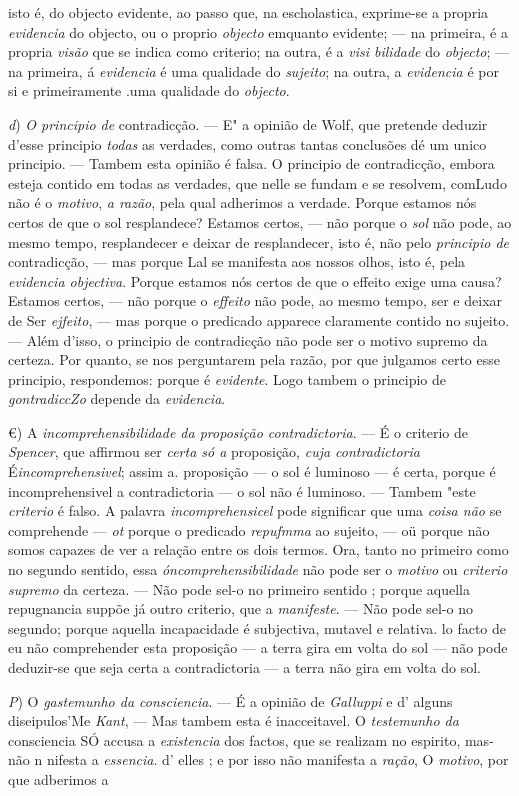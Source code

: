 isto é, do objecto evidente, ao passo que, na escholastica, exprime-se a propria \emph{evidencia} do objecto, ou o proprio \emph{objecto} emquanto evidente; --- na primeira, é a propria \emph{visão} que se indica como criterio; na outra, é a \emph{visi bilidade} do \emph{objecto}; --- na primeira, á \emph{evidencia} é uma qualidade do \emph{sujeito}; na outra, a \emph{evidencia} é por si e primeiramente .uma qualidade do \emph{objecto}.\par \emph{d}) \emph{O principio de} contradicção. --- E" a opinião de Wolf, que pretende deduzir d'esse principio \emph{todas} as verdades, como outras tantas conclusões dé um unico principio. --- Tambem esta opinião é falsa. O principio de contradicção, embora esteja contido em todas as verdades, que nelle se fundam e se resolvem, comLudo não é o \emph{motivo}, \emph{a razão}, pela qual adherimos a verdade. Porque estamos nós certos de que o sol resplandece? Estamos certos, --- não porque o \emph{sol} não pode, ao mesmo tempo, resplandecer e deixar de resplandecer, isto é, não pelo \emph{principio de} contradicção, --- mas porque Lal se manifesta aos nossos olhos, isto é, pela \emph{evidencia objectiva}. Porque estamos nós certos de que o effeito exige uma causa? Estamos certos, --- não porque o \emph{effeito} não pode, ao mesmo tempo, ser e deixar de Ser \emph{ejfeito}, --- mas porque o predicado apparece claramente contido no sujeito. --- Além d'isso, o principio de contradicção não pode ser o motivo supremo da certeza. Por quanto, se nos perguntarem pela razão, por que julgamos certo esse principio, respondemos: porque é \emph{evidente}. Logo tambem o principio de \emph{gontradiccZo} depende da \emph{evidencia}.\par €) A \emph{incomprehensibilidade da proposição contradictoria}. --- É o criterio de \emph{Spencer}, que affirmou ser \emph{certa só a} proposição, \emph{cuja contradictoria} É\emph{incomprehensivel}; assim a. proposição --- o sol é luminoso --- é certa, porque é incomprehensivel a contradictoria --- o sol não é luminoso. --- Tambem "este \emph{criterio} é falso. A palavra \emph{incomprehensicel} pode significar que uma \emph{coisa não} se comprehende --- \emph{ot} porque o predicado \emph{repufmma} ao sujeito, --- oü porque não somos capazes de ver a relação entre os dois termos. Ora, tanto no primeiro como no segundo sentido, essa \emph{óncomprehensibilidade} não pode ser o \emph{motivo} ou \emph{criterio supremo} da certeza. --- Não pode sel-o no primeiro sentido ; porque aquella repugnancia suppõe já outro criterio, que a \emph{manifeste}. --- Não pode sel-o no segundo; porque aquella incapacidade é subjectiva, mutavel e relativa. lo facto de eu não comprehender esta proposição --- a terra gira em volta do sol --- não pode deduzir-se que seja certa a contradictoria --- a terra não gira em volta do sol.\par \emph{P}) O \emph{gastemunho da consciencia}. --- É a opinião de \emph{Galluppi} e d' alguns diseipulos'Me \emph{Kant}, --- Mas tambem esta é inacceitavel. O \emph{testemunho da} consciencia SÓ accusa a \emph{existencia} dos factos, que se realizam no espirito, mas-não n nifesta a \emph{essencia}. d' elles ; e por isso não manifesta a \emph{ração}, O \emph{motivo}, por que adberimos a 